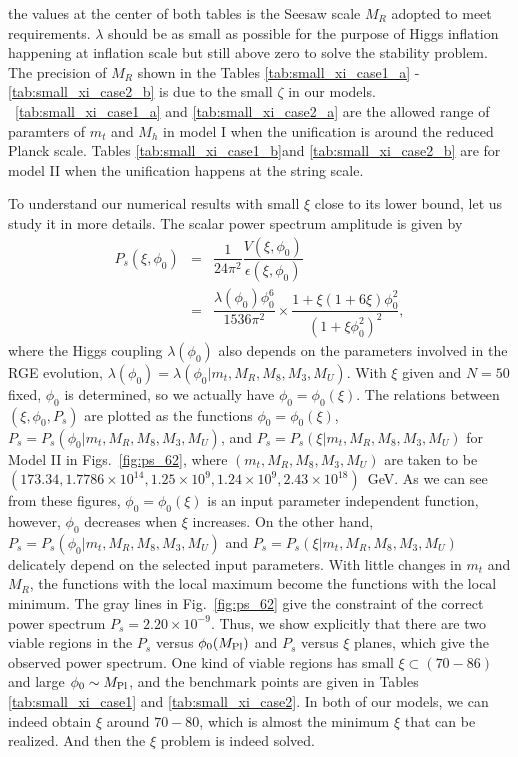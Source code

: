 \documentclass[aps,prd,preprint,superscriptaddress,showpacs,ctexart]{revtex4-1}
\begin{document}
the values at the center of both tables is the Seesaw scale $M_{R}$
adopted to meet requirements. $\lambda$ should be as small as possible
for the purpose of Higgs inflation happening at inflation scale but
still above zero to solve the stability problem. The precision of
$M_{R}$ shown in the Tables \ref{tab:small_xi_case1_a}{ - \ref{tab:small_xi_case2_b}
is due to the small $\zeta$ in our models. ~\ref{tab:small_xi_case1_a}
and \ref{tab:small_xi_case2_a} are the allowed range of paramters
of $m_{t}$ and $M_{h}$ in model I when the unification is around
the reduced Planck scale. Tables \ref{tab:small_xi_case1_b}and \ref{tab:small_xi_case2_b}
are for model II when the unification happens at the string scale.}

To understand our numerical results with small $\xi$ close to its
lower bound, let us study it in more details. The scalar power spectrum
amplitude is given by
\begin{eqnarray}
P_{s}(\xi,\phi_{0}) & = & \dfrac{1}{24\pi^{2}}\dfrac{V(\xi,\phi_{0})}{\epsilon(\xi,\phi_{0})}\nonumber \\
 & = & \dfrac{\lambda(\phi_{0})\phi_{0}^{6}}{1536\pi^{2}}\times\dfrac{1+\xi(1+6\xi)\phi_{0}^{2}}{(1+\xi\phi_{0}^{2})^{2}},
\end{eqnarray}
where the Higgs coupling $\lambda(\phi_{0})$ also depends on the
parameters involved in the RGE evolution, $\lambda(\phi_{0})=\lambda(\phi_{0}|m_{t},M_{R},M_{8},M_{3},M_{U})$.
With $\xi$ given and $N=50$ fixed, $\phi_{0}$ is determined, so
we actually have $\phi_{0}=\phi_{0}(\xi)$. The relations between
$(\xi,\phi_{0},P_{s})$ are plotted as the functions $\phi_{0}=\phi_{0}(\xi)$,
$P_{s}=P_{s}(\phi_{0}|m_{t},M_{R},M_{8},M_{3},M_{U})$, and $P_{s}=P_{s}(\xi|m_{t},M_{R},M_{8},M_{3},M_{U})$
for Model II in Figs.~\ref{fig:ps_62}, where $(m_{t},M_{R},M_{8},M_{3},M_{U})$
are taken to be $(173.34,1.7786\times10^{14},1.25\times10^{9},1.24\times10^{9},2.43\times10^{18})$~GeV.
As we can see from these figures, $\phi_{0}=\phi_{0}(\xi)$ is an
input parameter independent function, however, $\phi_{0}$ decreases when $\xi$
increases. On the other hand, $P_{s}=P_{s}(\phi_{0}|m_{t},M_{R},M_{8},M_{3},M_{U})$
and $P_{s}=P_{s}(\xi|m_{t},M_{R},M_{8},M_{3},M_{U})$ delicately depend
on the selected input parameters. With little changes in $m_{t}$
and $M_{R}$, the functions with the local maximum become the functions
with the local minimum. The gray lines in Fig.~\ref{fig:ps_62} give the constraint of the correct power spectrum $P_{s}=2.20\times10^{-9}$.
Thus, we show explicitly that there are two viable regions in the
$P_{s}$ versus $\phi_{0}(M_{{\rm Pl}})$ and $P_{s}$ versus $\xi$
planes, which give the observed power spectrum. One kind of viable
regions has small $\xi\subset(70-86)$ and large $\phi_{0}\sim M_{{\rm Pl}}$,
and the benchmark points are given in Tables \ref{tab:small_xi_case1} and
\ref{tab:small_xi_case2}. In both of our models, we can indeed obtain
$\xi$ around $70-80$, which is almost the minimum $\xi$ that can
be realized. And then the $\xi$ problem is indeed solved.
 
\end{document}
